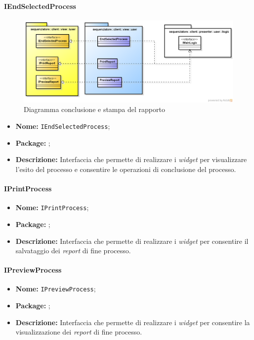 \paragraph{IEndSelectedProcess}
\begin{figure}[H] \centering \includegraphics[width=%
\textwidth]
{./pack/EndSelectedProcess.png} \caption{Diagramma conclusione e stampa del rapporto}
\end{figure}
\begin{itemize}
\item \textbf{Nome:} \texttt{IEndSelectedProcess};
\item \textbf{Package:} \texttt{\iViewUser{}};
\item \textbf{Descrizione:} Interfaccia che permette di realizzare i \textit{widget} per visualizzare l'esito del processo e consentire le operazioni di conclusione del processo.
\end{itemize}

\paragraph{IPrintProcess}
\begin{itemize}
\item \textbf{Nome:} \texttt{IPrintProcess};
\item \textbf{Package:} \texttt{\iViewUser{}};
\item \textbf{Descrizione:} Interfaccia che permette di realizzare i \textit{widget} per consentire il salvataggio dei \textit{report} di fine processo.
\end{itemize}

\paragraph{IPreviewProcess}
\begin{itemize}
\item \textbf{Nome:} \texttt{IPreviewProcess};
\item \textbf{Package:} \texttt{\iViewUser{}};
\item \textbf{Descrizione:} Interfaccia che permette di realizzare i \textit{widget} per consentire la visualizzazione dei \textit{report} di fine processo.
\end{itemize}